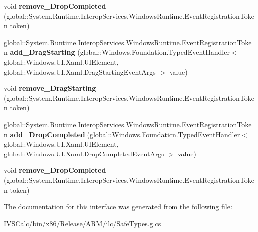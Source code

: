 \begin{DoxyCompactItemize}
\item 
\mbox{\label{interface_windows_1_1_u_i_1_1_xaml_1_1_i_u_i_element3_ab5b2415864634b87ef93d36e64e197a5}} 
void {\bfseries remove\+\_\+\+Drop\+Completed} (global\+::\+System.\+Runtime.\+Interop\+Services.\+Windows\+Runtime.\+Event\+Registration\+Token token)
\item 
\mbox{\label{interface_windows_1_1_u_i_1_1_xaml_1_1_i_u_i_element3_a65b4b6369aa0a951c30016151b14ac95}} 
global\+::\+System.\+Runtime.\+Interop\+Services.\+Windows\+Runtime.\+Event\+Registration\+Token {\bfseries add\+\_\+\+Drag\+Starting} (global\+::\+Windows.\+Foundation.\+Typed\+Event\+Handler$<$ global\+::\+Windows.\+U\+I.\+Xaml.\+U\+I\+Element, global\+::\+Windows.\+U\+I.\+Xaml.\+Drag\+Starting\+Event\+Args $>$ value)
\item 
\mbox{\label{interface_windows_1_1_u_i_1_1_xaml_1_1_i_u_i_element3_a9763c1f3007106faa5edbab72152e864}} 
void {\bfseries remove\+\_\+\+Drag\+Starting} (global\+::\+System.\+Runtime.\+Interop\+Services.\+Windows\+Runtime.\+Event\+Registration\+Token token)
\item 
\mbox{\label{interface_windows_1_1_u_i_1_1_xaml_1_1_i_u_i_element3_aa1dd03e3acd153862a9ab2a172d49cd0}} 
global\+::\+System.\+Runtime.\+Interop\+Services.\+Windows\+Runtime.\+Event\+Registration\+Token {\bfseries add\+\_\+\+Drop\+Completed} (global\+::\+Windows.\+Foundation.\+Typed\+Event\+Handler$<$ global\+::\+Windows.\+U\+I.\+Xaml.\+U\+I\+Element, global\+::\+Windows.\+U\+I.\+Xaml.\+Drop\+Completed\+Event\+Args $>$ value)
\item 
\mbox{\label{interface_windows_1_1_u_i_1_1_xaml_1_1_i_u_i_element3_ab5b2415864634b87ef93d36e64e197a5}} 
void {\bfseries remove\+\_\+\+Drop\+Completed} (global\+::\+System.\+Runtime.\+Interop\+Services.\+Windows\+Runtime.\+Event\+Registration\+Token token)
\end{DoxyCompactItemize}


The documentation for this interface was generated from the following file\+:\begin{DoxyCompactItemize}
\item 
I\+V\+S\+Calc/bin/x86/\+Release/\+A\+R\+M/ilc/Safe\+Types.\+g.\+cs\end{DoxyCompactItemize}
